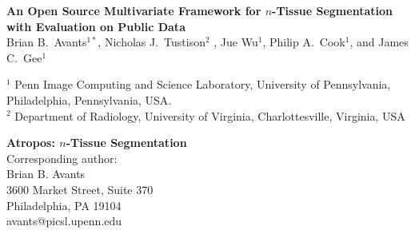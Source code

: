 \documentclass[11pt,english]{article}
\begin{document}
\normalem

\vspace*{5cm}

\begin{center}
{\Large \bf An Open Source Multivariate Framework for $n$-Tissue
  Segmentation with Evaluation on Public Data} \\
\vspace*{0.5cm}
{\normalsize Brian B.~Avants$^{1*}$,  Nicholas J.~Tustison$^2$%
, 
Jue Wu$^1$, Philip A.~Cook$^1$, and James C.~Gee$^1$} \\
\begin{singlespace} 
{\scriptsize  $^1$ Penn Image Computing and Science Laboratory, University of Pennsylvania, Philadelphia, Pennsylvania,  USA.\\
  $^2$ Department of Radiology, University of Virginia, Charlottesville, Virginia, USA}
\end{singlespace}
\end{center}

\vfill

\begin{singlespace} 
\scriptsize
\flushleft
{\bf Atropos:  $n$-Tissue Segmentation}\\
Corresponding author: \\
Brian B. Avants\\
3600 Market Street, Suite 370\\
Philadelphia, PA  19104\\
avants@picsl.upenn.edu\\
\end{singlespace} 

%
%

\clearpage
\end{document}
